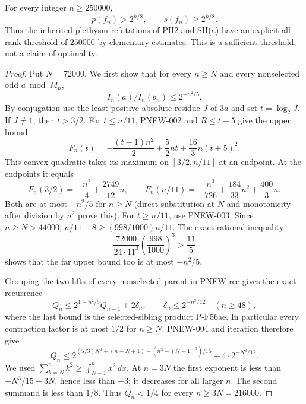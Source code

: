 \begin{theorem}
For every integer $n\ge250000$,
\[
                  p(f_n)>2^{n/8},\qquad s(f_n)\ge2^{n/8}.
\]
Thus the inherited plethysm refutations of PH2 and SH(a) have an
explicit all-rank threshold of $250000$ by elementary estimates.
This is a sufficient threshold, not a claim of optimality.
\end{theorem}
\begin{proof}
Put $N=72000$.  We first show that for every $n\ge N$ and
every nonselected odd $a\bmod M_n$,
\[
                   I_n(a)/I_n(b_n)\le2^{-n^2/5}.
\]
By conjugation use the least positive absolute residue
$J$ of $3a$ and set $t=\log_2J$.  If $J\ne1$, then
$t>3/2$.  For $t\le n/11$, PNEW-002 and $R\le t+5$ give
the upper bound
\[
 F_n(t)=-\frac{(t-1)n^2}{2}
          +\frac52nt+\frac{16}{3}n(t+5)^2.
\]
This convex quadratic takes its maximum on
$[3/2,n/11]$ at an endpoint.  At the endpoints it equals
\[
 F_n(3/2)=-\frac{n^2}{4}+\frac{2749}{12}n,
 \qquad
 F_n(n/11)=-\frac{n^3}{726}+\frac{184}{33}n^2+\frac{400}{3}n.
\]
Both are at most $-n^2/5$ for $n\ge N$ (direct substitution at
$N$ and monotonicity after division by $n^2$ prove this).
For $t\ge n/11$, use PNEW-003.  Since $n\ge N>44000$,
$n/11-8\ge(998/1000)n/11$.  The exact rational inequality
\[
 \frac{72000}{24\cdot11^3}\left(\frac{998}{1000}\right)^3
                              >\frac{11}{5}
\]
shows that the far upper bound too is at most $-n^2/5$.

Grouping the two lifts of every nonselected parent in
PNEW-rec gives the exact recurrence
\[
 Q_n\le2^{1-n^2/5}Q_{n-1}+2\delta_n,\qquad
 \delta_n\le2^{-n^3/12}\quad(n\ge48),
\]
where the last bound is the selected-sibling product P-F56ae.
In particular every contraction factor is at most $1/2$ for
$n\ge N$.  PNEW-004 and iteration therefore give
\[
 Q_n\le
 2^{(5/3)N^3+(n-N+1)-(n^3-(N-1)^3)/15}
                  +4\cdot2^{-N^3/12}.
\]
We used
$\sum_{k=N}^n k^2\ge\int_{N-1}^{n}x^2\,dx$.
At $n=3N$ the first exponent is less than
$-N^3/15+3N$, hence less than $-3$; it decreases for
all larger $n$.  The second summand is less than $1/8$.
Thus $Q_n<1/4$ for every $n\ge3N=216000$.


\end{proof}
